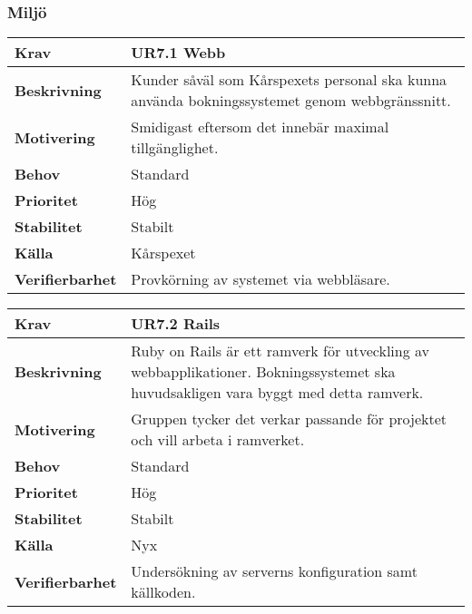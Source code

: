 \documentclass[a4paper, twoside, 11pt, titlepage]{article}
\begin{document}
		\subsubsection{Miljö}


		\begin{tabular} { p{2.6cm} p{12.5cm} }
			\hline
			\sffamily\textbf{Krav} & \sffamily\textbf{UR7.1 Webb } \\
			\hline
			\sffamily\textbf{Beskrivning} & Kunder såväl som Kårspexets personal ska kunna använda bokningssystemet genom webbgränssnitt.  \\
			\hline
			\sffamily\textbf{Motivering} & Smidigast eftersom det innebär maximal tillgänglighet.  \\
			\hline
			\sffamily\textbf{Behov} & Standard  \\
			\hline
			\sffamily\textbf{Prioritet} & Hög  \\
			\hline
			\sffamily\textbf{Stabilitet} & Stabilt  \\
			\hline
			\sffamily\textbf{Källa} & Kårspexet  \\
			\hline
			\sffamily\textbf{Verifierbarhet} & Provkörning av systemet via webbläsare.  \\
			\hline
		\end{tabular}
		\vspace{6mm}

		\begin{tabular} { p{2.6cm} p{12.5cm} }
			\hline
			\sffamily\textbf{Krav} & \sffamily\textbf{UR7.2 Rails } \\
			\hline
			\sffamily\textbf{Beskrivning} & Ruby on Rails är ett ramverk för utveckling av webbapplikationer. Bokningssystemet ska huvudsakligen vara byggt med detta ramverk.  \\
			\hline
			\sffamily\textbf{Motivering} & Gruppen tycker det verkar passande för projektet och vill arbeta i ramverket.  \\
			\hline
			\sffamily\textbf{Behov} & Standard  \\
			\hline
			\sffamily\textbf{Prioritet} & Hög  \\
			\hline
			\sffamily\textbf{Stabilitet} & Stabilt  \\
			\hline
			\sffamily\textbf{Källa} & Nyx  \\
			\hline
			\sffamily\textbf{Verifierbarhet} & Undersökning av serverns konfiguration samt källkoden.  \\
			\hline
		\end{tabular}
		\vspace{6mm}
\end{document}
